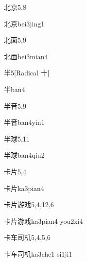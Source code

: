 \begin{entry}{北京}{5,8}
  \begin{phonetics}{北京}{bei3jing1}
  \end{phonetics}
\end{entry}

\begin{entry}{北面}{5,9}
  \begin{phonetics}{北面}{bei3mian4}
  \end{phonetics}
\end{entry}

\begin{entry}{半}{5}[Radical 十]
  \begin{phonetics}{半}{ban4}
  \end{phonetics}
\end{entry}

\begin{entry}{半音}{5,9}
  \begin{phonetics}{半音}{ban4yin1}
  \end{phonetics}
\end{entry}

\begin{entry}{半球}{5,11}
  \begin{phonetics}{半球}{ban4qiu2}
  \end{phonetics}
\end{entry}

\begin{entry}{卡片}{5,4}
  \begin{phonetics}{卡片}{ka3pian4}
  \end{phonetics}
\end{entry}

\begin{entry}{卡片游戏}{5,4,12,6}
  \begin{phonetics}{卡片游戏}{ka3pian4 you2xi4}
  \end{phonetics}
\end{entry}

\begin{entry}{卡车司机}{5,4,5,6}
  \begin{phonetics}{卡车司机}{ka3che1 si1ji1}
  \end{phonetics}
\end{entry}

